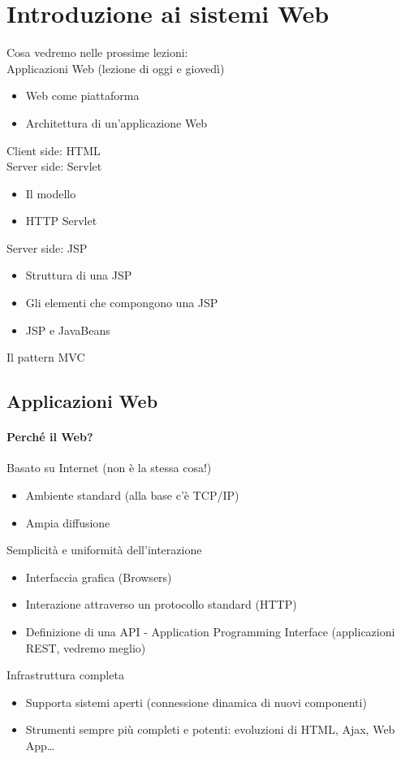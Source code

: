 \chapter{Introduzione ai sistemi Web}
Cosa vedremo nelle prossime lezioni:
\\Applicazioni Web (lezione di oggi e giovedì)
\begin{itemize}
    \item Web come piattaforma
    \item Architettura di un'applicazione Web
\end{itemize}
Client side: HTML
\\Server side: Servlet
\begin{itemize}
    \item Il modello
    \item HTTP Servlet
\end{itemize}
Server side: JSP
\begin{itemize}
    \item Struttura di una JSP
    \item Gli elementi che compongono una JSP
    \item JSP e JavaBeans
\end{itemize}
Il pattern MVC

\section{Applicazioni Web}
\subsubsection{Perché il Web?}
Basato su Internet (non è la stessa cosa!)
\begin{itemize}
    \item Ambiente standard (alla base c'è TCP/IP)
    \item Ampia diffusione
\end{itemize}
Semplicità e uniformità dell'interazione
\begin{itemize}
    \item Interfaccia grafica (Browsers)
    \item Interazione attraverso un protocollo standard (HTTP)
    \item Definizione di una API - Application Programming Interface (applicazioni REST, vedremo meglio)
\end{itemize}
Infrastruttura completa
\begin{itemize}
    \item Supporta sistemi aperti (connessione dinamica di nuovi componenti)
    \item Strumenti sempre più completi e potenti: evoluzioni di HTML, Ajax, Web App…
\end{itemize}

